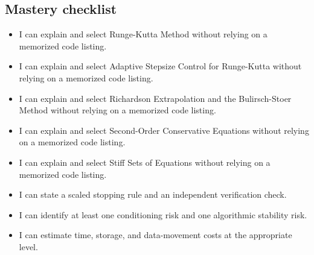 \documentclass[10pt,letterpaper]{article}
\begin{document}
\subsection*{Mastery checklist}
\begin{itemize}
\item[$\square$] I can explain and select Runge-Kutta Method without relying on a memorized code listing.
\item[$\square$] I can explain and select Adaptive Stepsize Control for Runge-Kutta without relying on a memorized code listing.
\item[$\square$] I can explain and select Richardson Extrapolation and the Bulirsch-Stoer Method without relying on a memorized code listing.
\item[$\square$] I can explain and select Second-Order Conservative Equations without relying on a memorized code listing.
\item[$\square$] I can explain and select Stiff Sets of Equations without relying on a memorized code listing.
\item[$\square$] I can state a scaled stopping rule and an independent verification check.
\item[$\square$] I can identify at least one conditioning risk and one algorithmic stability risk.
\item[$\square$] I can estimate time, storage, and data-movement costs at the appropriate level.
\end{itemize}
\end{document}
